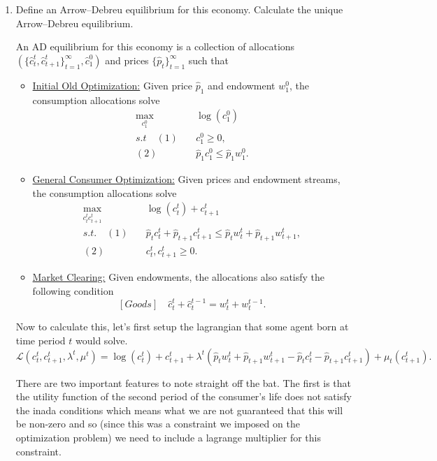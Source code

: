 \documentclass[11pt,english]{article}
\begin{document}
\begin{enumerate}
    \item[(a)] Define an Arrow--Debreu equilibrium for this economy. Calculate
        the unique Arrow--Debreu equilibrium.
    \begin{solution}
 An AD equilibrium for this economy is a collection of allocations $\left(\{\hat{c}_t^t, \hat{c}_{t+1}^t\}_{t=1}^\infty, \hat{c}_1^0\right)$ and prices $\{\hat{p}_t\}_{t=1}^\infty$ such that
\begin{itemize}
\item \underline{Initial Old Optimization:} Given price $\hat{p}_1$ and endowment $w_1^0$, the consumption allocations solve
\begin{align*}
\max_{c_1^0}&\quad \log(c_1^0)\\
s.t\quad (1)&\quad c_1^0 \geq 0,\\
(2)&\quad \hat{p}_1 c_1^0 \leq \hat{p}_1 w_1^0.
\end{align*}

\item \underline{General Consumer Optimization:} Given prices and endowment streams, the consumption allocations solve
\begin{align*}
\max_{c_t^t c_{t+1}^t}&\quad \log(c_t^t) + c_{t+1}^t\\
s.t.\quad (1)&\quad \hat{p}_t c_t^t  + \hat{p}_{t+1} c_{t+1}^t \leq \hat{p}_t w_t^t  + \hat{p}_{t+1} w_{t+1}^t,\\
(2)&\quad c_t^t, c_{t+1}^t \geq 0.
\end{align*}

\item \underline{Market Clearing:} Given endowments, the allocations also satisfy the following condition
$$[Goods]\quad \hat{c}_t^t + \hat{c}_t^{t-1} = w_t^t + w_t^{t-1}.$$
\end{itemize}

Now to calculate this, let's first setup the lagrangian that some agent born at time period $t$ would solve.
$$\mathcal{L}(c_t^t, c_{t+1}^t, \lambda^t, \mu^t) = \log(c_t^t) + c_{t+1}^t + \lambda^t(\hat{p}_t w_t^t  + \hat{p}_{t+1} w_{t+1}^t - \hat{p}_t c_t^t  - \hat{p}_{t+1} c_{t+1}^t) + \mu_t(c_{t+1}^t).$$
    
There are two important features to note straight off the bat. The first is that the utility function of the second period of the consumer's life does not satisfy the inada conditions which means what we are not guaranteed that this will be non-zero and so (since this was a constraint we imposed on the optimization problem) we need to include a lagrange multiplier for this constraint. 


\end{solution}
\end{enumerate}
\end{document}
